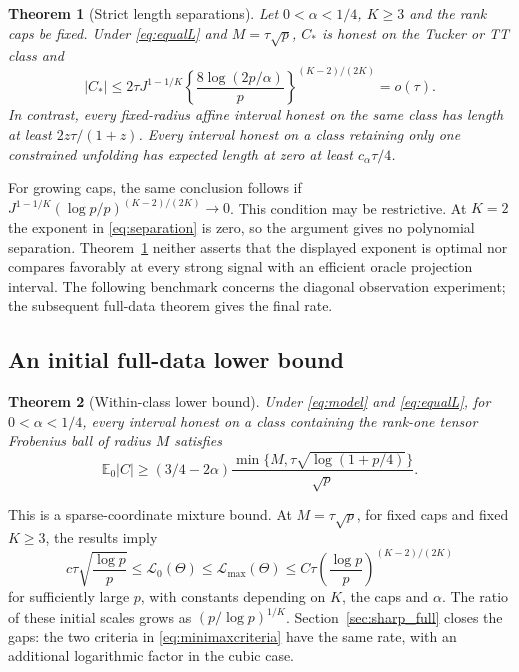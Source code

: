 \documentclass[11pt]{article}
\newtheorem{theorem}{Theorem}
\theoremstyle{remark}
\newcommand{\E}{\mathbb E}
\newcommand{\calL}{\mathcal L}
\begin{document}
\begin{theorem}[Strict length separations]\label{thm:separation}
Let $0<\alpha<1/4$, $K\ge3$ and the rank caps be fixed. Under \eqref{eq:equalL} and $M=\tau\sqrt p$, $C_*$ is honest on the Tucker or TT class and
\begin{equation}\label{eq:separation}
 |C_*|\le2\tau J^{1-1/K}
 \left\{\frac{8\log(2p/\alpha)}p\right\}^{(K-2)/(2K)}=o(\tau).
\end{equation}
In contrast, every fixed-radius affine interval honest on the same class has length at least $2z\tau/(1+z)$. Every interval honest on a class retaining only one constrained unfolding has expected length at zero at least $c_\alpha\tau/4$.
\end{theorem}

For growing caps, the same conclusion follows if $J^{1-1/K}(\log p/p)^{(K-2)/(2K)}\to0$. This condition may be restrictive. At $K=2$ the exponent in \eqref{eq:separation} is zero, so the argument gives no polynomial separation. Theorem~\ref{thm:separation} neither asserts that the displayed exponent is optimal nor compares favorably at every strong signal with an efficient oracle projection interval. The following benchmark concerns the diagonal observation experiment; the subsequent full-data theorem gives the final rate.

\subsection{An initial full-data lower bound}\label{sec:gap}

\begin{theorem}[Within-class lower bound]\label{thm:jointlower}
Under \eqref{eq:model} and \eqref{eq:equalL}, for $0<\alpha<1/4$, every interval honest on a class containing the rank-one tensor Frobenius ball of radius $M$ satisfies
\begin{equation}\label{eq:jointlower}
 \E_0|C|\ge(3/4-2\alpha)
 \frac{\min\{M,\tau\sqrt{\log(1+p/4)}\}}{\sqrt p}.
\end{equation}
\end{theorem}

This is a sparse-coordinate mixture bound. At $M=\tau\sqrt p$, for fixed caps and fixed $K\ge3$, the results imply
\begin{equation}\label{eq:gap}
 c\tau\sqrt{\frac{\log p}p}
 \le\calL_0(\Theta)\le\calL_{\max}(\Theta)
 \le C\tau\left(\frac{\log p}p\right)^{(K-2)/(2K)}
\end{equation}
for sufficiently large $p$, with constants depending on $K$, the caps and $\alpha$. The ratio of these initial scales grows as $(p/\log p)^{1/K}$. Section~\ref{sec:sharp_full} closes the gaps: the two criteria in \eqref{eq:minimaxcriteria} have the same rate, with an additional logarithmic factor in the cubic case.
\end{document}
